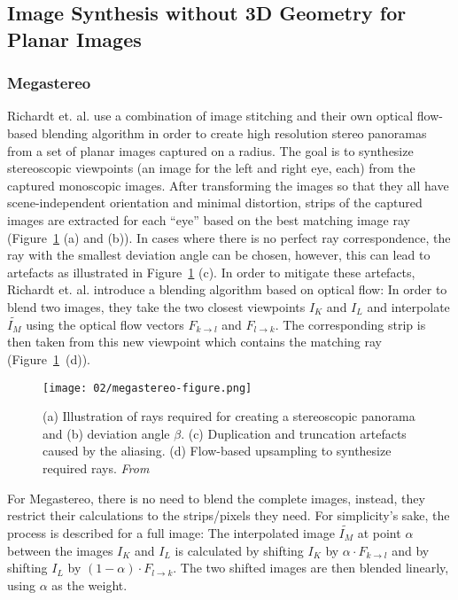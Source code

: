 \subsection{Image Synthesis without 3D Geometry for Planar Images}

\subsubsection{Megastereo \label{megastereo}}
Richardt et. al. \cite{megastereo} use a combination of image stitching and their own optical flow-based blending algorithm in order to create high resolution stereo panoramas from a set of planar images captured on a radius. The goal is to synthesize stereoscopic viewpoints (an image for the left and right eye, each) from the captured monoscopic images. After transforming the images so that they all have scene-independent orientation and minimal distortion, strips of the captured images are extracted for each ``eye'' based on the best matching image ray (Figure~\ref{fig:megastereo-figure} (a) and (b)). In cases where there is no perfect ray correspondence, the ray with the smallest deviation angle can be chosen, however, this can lead to artefacts as illustrated in Figure~\ref{fig:megastereo-figure} (c). In order to mitigate these artefacts, Richardt et. al. introduce a blending algorithm based on optical flow: 
In order to blend two images, they take the two closest viewpoints $I_K$ and $I_L$ and interpolate $\widetilde{I_M}$ using the optical flow vectors $F_{k\rightarrow l}$ and $F_{l\rightarrow k}$.  The corresponding strip is then taken from this new viewpoint which contains the matching ray (Figure~\ref{fig:megastereo-figure}~(d)).

\begin{figure}[]
\centering
\texttt{[image: 02/megastereo-figure.png]}
\caption[Flow-based blending in Megastereo]{(a) Illustration of rays required for creating a stereoscopic panorama and (b) deviation angle $\beta$. (c) Duplication and truncation artefacts caused by the aliasing. (d) Flow-based upsampling to synthesize required rays. \emph{From \cite{megastereo}}}
\label{fig:megastereo-figure}
\end{figure}

For Megastereo, there is no need to blend the complete images, instead, they restrict their calculations to the strips/pixels they need. For simplicity's sake, the process is described for a full image:
The interpolated image $\widetilde{I_M}$ at point $\alpha$ between the images $I_K$ and $I_L$ is calculated by shifting $I_K$ by $\alpha \cdot F_{k\rightarrow l}$ and by shifting $I_L$ by $(1 - \alpha) \cdot F_{l\rightarrow k}$. The two shifted images are then blended linearly, using $\alpha$ as the weight.

